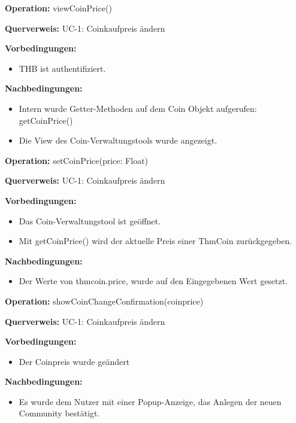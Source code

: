 \documentclass[a4paper,12pt]{article}
\begin{document}
	\begin{contractbox}
		\textbf{Operation:} viewCoinPrice()
		
			\textbf{Querverweis:} UC-1: Coinkaufpreis ändern
		
		\textbf{Vorbedingungen:}
		\begin{itemize}[noitemsep]
			\item THB ist authentifiziert.
		\end{itemize}
		
		\textbf{Nachbedingungen:}
		\begin{itemize}[noitemsep]
			\item Intern wurde Getter-Methoden auf dem Coin Objekt aufgerufen: getCoinPrice()
			\item Die View des Coin-Verwaltungstools wurde angezeigt.
		\end{itemize}
	\end{contractbox}
	
	\begin{contractbox}
		\textbf{Operation:} setCoinPrice(price: Float)
		
		\textbf{Querverweis:} UC-1: Coinkaufpreis ändern
		
		\textbf{Vorbedingungen:}
		\begin{itemize}[noitemsep]
			\item Das Coin-Verwaltungstool ist geöffnet.
			\item Mit getCoinPrice() wird der aktuelle Preis einer ThmCoin zurückgegeben.
		\end{itemize}
		
		\textbf{Nachbedingungen:}
		\begin{itemize}[noitemsep]
			\item Der Werte von thmcoin.price, wurde auf den Eingegebenen Wert gesetzt.
		\end{itemize}
	\end{contractbox}

	\begin{contractbox}
		\textbf{Operation:} showCoinChangeConfirmation(coinprice)
		
			\textbf{Querverweis:} UC-1: Coinkaufpreis ändern
		
		\textbf{Vorbedingungen:}
		\begin{itemize}[noitemsep]
			\item Der Coinpreis wurde geändert
		\end{itemize}
		
		\textbf{Nachbedingungen:}
		\begin{itemize}[noitemsep]
			\item Es wurde dem Nutzer mit einer Popup-Anzeige, das Anlegen der neuen Community bestätigt.
		\end{itemize}
	\end{contractbox}
\end{document}
